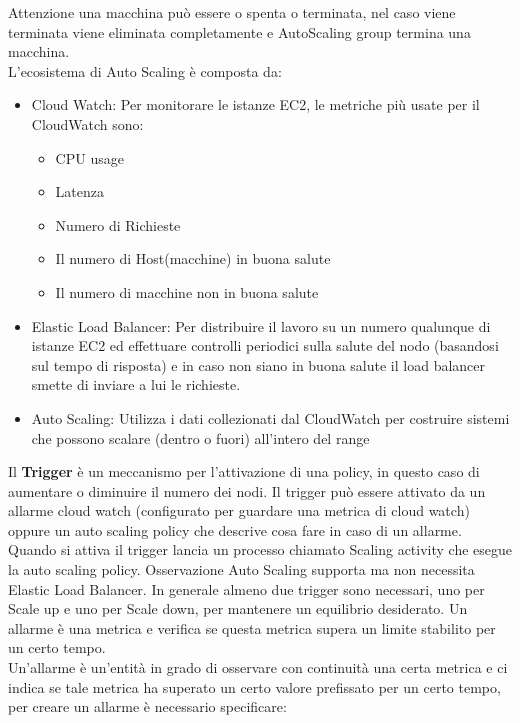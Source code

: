 \documentclass[11pt, twocolumn]{article}
\newenvironment{myitemize}
{ \begin{itemize}[topsep=0ex]
		\setlength{\itemsep}{0pt}
		\setlength{\parskip}{0pt}
		\setlength{\parsep}{0pt}     }
	{ \end{itemize}                  }
\begin{document}
Attenzione una macchina può essere o spenta o terminata, nel caso viene terminata viene eliminata completamente e AutoScaling group termina una macchina.\\
L'ecosistema di Auto Scaling è composta da:
\begin{myitemize}
	\item Cloud Watch: Per monitorare le istanze EC2, le metriche più usate per il CloudWatch sono:
	\begin{myitemize}
		\item CPU usage
		\item Latenza
		\item Numero di Richieste
		\item Il numero di Host(macchine) in buona salute
		\item Il numero di macchine non in buona salute
	\end{myitemize}
	\item Elastic Load Balancer: Per distribuire il lavoro su un numero qualunque di istanze EC2 ed effettuare controlli periodici sulla salute del nodo (basandosi sul tempo di risposta) e in caso non siano in buona salute il load balancer smette di inviare a lui le richieste.
	\item Auto Scaling: Utilizza i dati collezionati dal CloudWatch per costruire sistemi che possono scalare (dentro o fuori) all'intero del range
\end{myitemize}
Il \textbf{Trigger} è un meccanismo per l'attivazione di una policy, in questo caso di aumentare o diminuire il numero dei nodi. Il trigger può essere attivato da un allarme cloud watch (configurato per guardare una metrica di cloud watch) oppure un auto scaling policy che descrive cosa fare in caso di un allarme. Quando si attiva il trigger lancia un processo chiamato Scaling activity che esegue la auto scaling policy.
Osservazione Auto Scaling supporta ma non necessita Elastic Load Balancer.
In generale almeno due trigger sono necessari, uno per Scale up e uno per Scale down, per mantenere un equilibrio desiderato.
Un allarme è una metrica e verifica se questa metrica supera un limite stabilito per un certo tempo.\\
Un'allarme è un'entità in grado di osservare con continuità una certa metrica e ci indica se tale metrica ha superato un certo valore prefissato per un certo tempo, per creare un allarme è necessario specificare:
\end{document}
